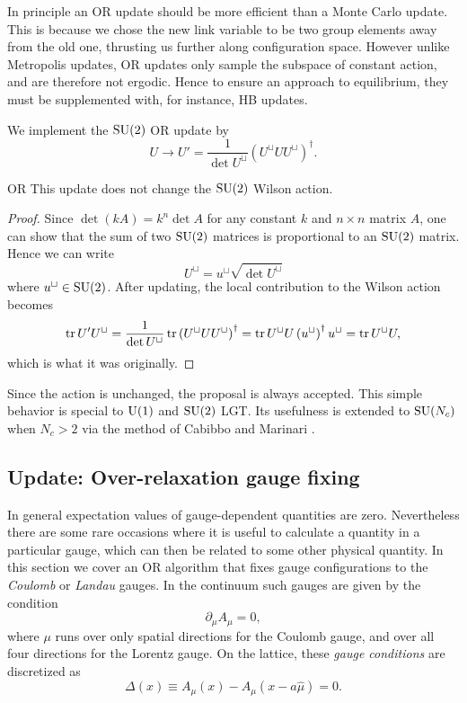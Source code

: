 In principle an OR update should be more efficient than a Monte
Carlo update. This is because we chose the new link variable to be two
group elements away from the old one, thrusting us further
along configuration space. However unlike Metropolis updates, OR updates 
only sample the subspace of constant action, and are therefore not ergodic. 
Hence to ensure an approach to equilibrium, they must be supplemented with, 
for instance, HB updates.

We implement the $\operatorname{SU}(2)$ OR update by
\begin{equation}\label{eq:ORupdate}
  U\to U'=\frac{1}{\det U^\sqcup}\left(U^\sqcup UU^\sqcup\right)^\dagger.
\end{equation}
\begin{proposition}{}{OR}\label{prp:OR}
  This update does not change the $\operatorname{SU}(2)$ Wilson action.
  \begin{proof}
   Since $\det(kA)=k^n\det A$ for any constant $k$ and $n\times n$ matrix $A$,
   one can show that the sum of two $\operatorname{SU}(2)$ matrices is proportional
   to an $\operatorname{SU}(2)$ matrix. Hence we can write
    $$
      U^\sqcup=u^\sqcup\sqrt{\det U^\sqcup}
    $$
    where $u^\sqcup\in\operatorname{SU}(2)$. After updating, the local contribution
    to the Wilson action becomes
    \begin{equation*}
      \tr U'U^\sqcup =\frac{1}{\det U^\sqcup}\tr
                       \left(U^\sqcup UU^\sqcup\right)^\dagger
                     =\tr U^\sqcup U\left(u^\sqcup\right)^\dagger u^\sqcup
                     =\tr U^\sqcup U,
    \end{equation*}
    which is what it was originally.
  \end{proof}
\end{proposition}
Since the action is unchanged, the proposal is always accepted. This simple 
behavior is special to $\operatorname{U}(1)$ and $\operatorname{SU}(2)$ LGT. Its usefulness is 
extended to $\operatorname{SU}(N_c)$ when $N_c>2$ via the method of Cabibbo and Marinari
\cite{cabibbo_new_1982}.

\subsection{Update: Over-relaxation gauge fixing}\label{sec:ORgaugefix}

In general expectation values of gauge-dependent quantities are zero.
Nevertheless there are some rare occasions where it is useful to calculate
a quantity in a particular gauge, which can then be related to some
other physical quantity. In this section we cover an OR
algorithm that fixes gauge configurations to the {\it Coulomb} or 
{\it Landau} gauges.
In the continuum such gauges are given by the condition
\begin{equation}
  \partial_\mu A_\mu=0,
\end{equation}
where $\mu$ runs over only spatial directions for the Coulomb gauge, and
over all four directions for the Lorentz gauge. On the lattice, these 
{\it gauge conditions} are discretized as
\begin{equation}
  \Delta(x)\equiv A_\mu(x)-A_\mu(x-a\hat\mu) =0.
\end{equation}

